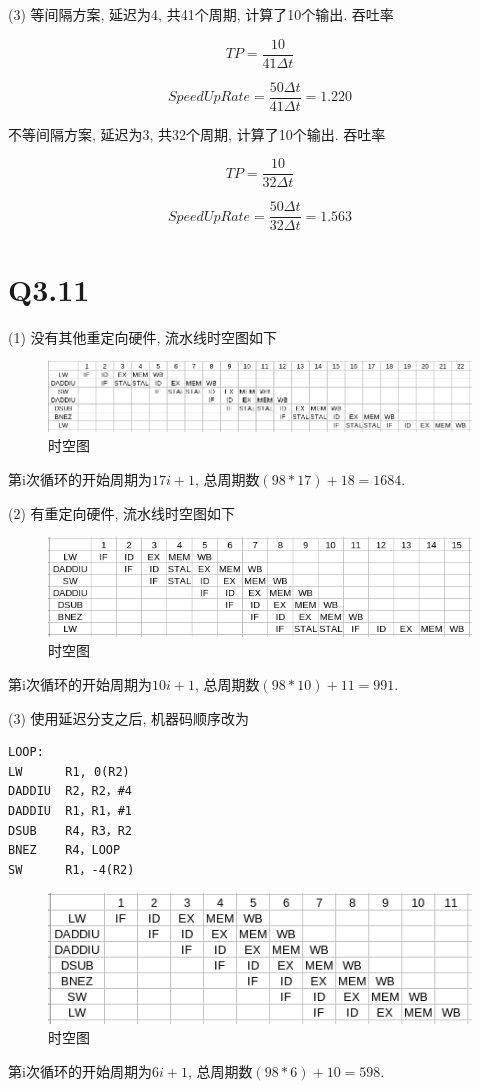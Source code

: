 \documentclass{article}
\begin{document}
\begin{CJK}{UTF8}{gbsn}
(3) 等间隔方案, 延迟为4, 共41个周期, 计算了10个输出. 吞吐率

$$TP=\frac{10}{41\Delta t}$$

$$SpeedUpRate=\frac{50\Delta t}{41\Delta t}=1.220$$

不等间隔方案, 延迟为3, 共32个周期, 计算了10个输出. 吞吐率

$$TP=\frac{10}{32\Delta t}$$

$$SpeedUpRate=\frac{50\Delta t}{32\Delta t}=1.563$$

\section{Q3.11}
\Large
\smallskip

(1) 没有其他重定向硬件, 流水线时空图如下

\begin{figure}[H]
\centering
\includegraphics[scale=0.6]{hw2-img2.png}
\caption{时空图}
\end{figure}

第i次循环的开始周期为$17i+1$, 总周期数$(98*17)+18=1684$.

(2) 有重定向硬件, 流水线时空图如下

\begin{figure}[H]
\centering
\includegraphics[scale=0.8]{hw2-img3.png}
\caption{时空图}
\end{figure}

第i次循环的开始周期为$10i+1$, 总周期数$(98*10)+11=991$.

(3) 使用延迟分支之后, 机器码顺序改为

\begin{verbatim}
LOOP: 
LW      R1, 0(R2)
DADDIU  R2，R2，#4 
DADDIU  R1，R1，#1 
DSUB    R4，R3，R2 
BNEZ    R4，LOOP 
SW      R1，-4(R2)
\end{verbatim}

\begin{figure}[H]
\centering
\includegraphics[scale=0.8]{hw2-img4.png}
\caption{时空图}
\end{figure}

第i次循环的开始周期为$6i+1$, 总周期数$(98*6)+10=598$.

\end{CJK}
\end{document}
